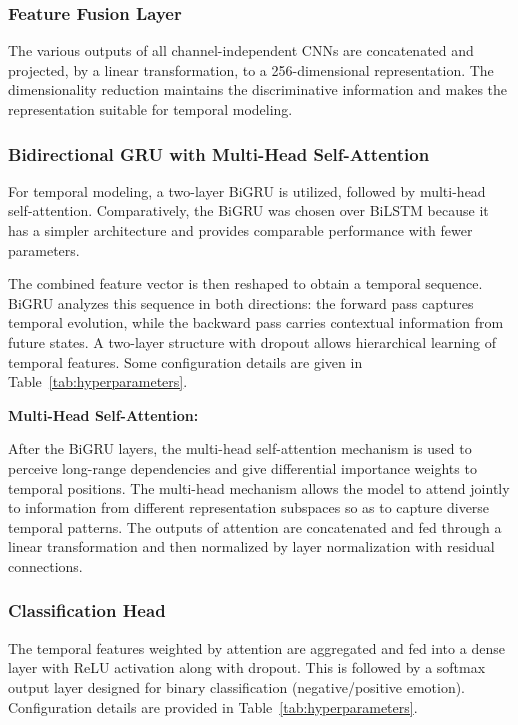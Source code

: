 \documentclass[conference]{IEEEtran}
\begin{document}
\subsubsection{Feature Fusion Layer}

The various outputs of all channel-independent CNNs are concatenated and projected, by a linear transformation, to a 256-dimensional representation. The dimensionality reduction maintains the discriminative information and makes the representation suitable for temporal modeling.

\subsubsection{Bidirectional GRU with Multi-Head Self-Attention}

For temporal modeling, a two-layer BiGRU is utilized, followed by multi-head self-attention. Comparatively, the BiGRU was chosen over BiLSTM because it has a simpler architecture and provides comparable performance with fewer parameters.

 The combined feature vector is then reshaped to obtain a temporal sequence. BiGRU analyzes this sequence in both directions: the forward pass captures temporal evolution, while the backward pass carries contextual information from future states. A two-layer structure with dropout allows hierarchical learning of temporal features. Some configuration details are given in Table~\ref{tab:hyperparameters}.

\textbf{Multi-Head Self-Attention:}

After the BiGRU layers, the multi-head self-attention mechanism is used to perceive long-range dependencies and give differential importance weights to temporal positions. The multi-head mechanism allows the model to attend jointly to information from different representation subspaces so as to capture diverse temporal patterns. The outputs of attention are concatenated and fed through a linear transformation and then normalized by layer normalization with residual connections. 

\subsubsection{Classification Head}

The temporal features weighted by attention are aggregated and fed into a dense layer with ReLU activation along with dropout. This is followed by a softmax output layer designed for binary classification (negative/positive emotion). Configuration details are provided in Table~\ref{tab:hyperparameters}.
\end{document}
